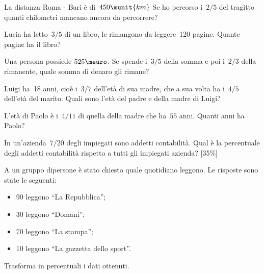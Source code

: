 \begin{htmulticols}{2}

\begin{esercizio}
\label{ese:3.75}
La distanza Roma - Bari è di~\(450\munit{km}\) Se ho percorso i~\(2/5\) del 
tragitto quanti chilometri
mancano ancora da percorrere?
\end{esercizio}

\begin{esercizio}
\label{ese:3.76}
Lucia ha letto~\(3/5\) di un libro, le rimangono da leggere~120 pagine. 
Quante pagine ha il libro?
\end{esercizio}

\begin{esercizio}
\label{ese:3.77}
Una persona possiede \(525\meuro\). Se spende i~\(3/5\) della somma e 
poi i~\(2/3\) della rimanente, quale somma di denaro gli rimane?
\end{esercizio}

\begin{esercizio}
\label{ese:3.78}
Luigi ha~18 anni, cioè i~\(3/7\) dell'età di sua madre, che a sua volta ha 
i~\(4/5\) dell'età del marito. Quali sono l'età del padre e della madre di 
Luigi?
\end{esercizio}

\begin{esercizio}
L'età di Paolo è i~\(4/11\) di quella della madre che
ha~\(55\) anni. 
Quanti anni ha Paolo?
\end{esercizio}

\begin{esercizio}
In un'azienda~\(7/20\) degli impiegati sono addetti contabilità.
Qual è la percentuale degli addetti contabilità
rispetto a tutti gli impiegati azienda? \hfill [35\%]
\end{esercizio}

\begin{esercizio}
A un gruppo dipersone è stato chiesto quale quotidiano
leggono. Le risposte sono state le seguenti:
\begin{itemize}[nosep]
\item 90 leggono ``La Repubblica'';
\item 30 leggono ``Domani'';
\item 70 leggono ``La stampa'';
\item 10 leggono ``La gazzetta dello sport''.
\end{itemize}
Trasforma in percentuali i dati ottenuti.\\
\end{esercizio}


\end{htmulticols}
